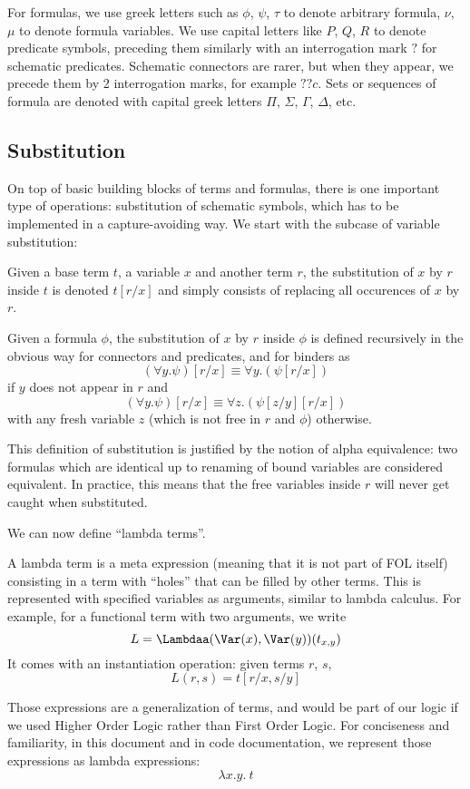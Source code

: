 For formulas, we use greek letters such as $\phi$, $\psi$, $\tau$ to denote arbitrary formula, $\nu$, $\mu$ to denote formula variables. We use capital letters like $P$, $Q$, $R$ to denote predicate symbols, preceding them similarly with an interrogation mark $?$ for schematic predicates. Schematic connectors are rarer, but when they appear, we precede them by 2 interrogation marks, for example $??c$. Sets or sequences of formula are denoted with capital greek letters $\Pi$, $\Sigma$, $\Gamma$, $\Delta$, etc.

\subsection{Substitution}
\label{subs:substitution}
On top of basic building blocks of terms and formulas, there is one important type of operations: substitution of schematic symbols, which has to be implemented in a capture-avoiding way. We start with the subcase of variable substitution:
\begin{defin}
Given a base term $t$, a variable $x$ and another term $r$, the substitution of $x$ by $r$ inside $t$ is denoted $ t[r/x] $ and simply consists of replacing all occurences of $x$ by $r$.

Given a formula $\phi$, the substitution of $x$ by $r$ inside $\phi$ is defined recursively in the obvious way for connectors and predicates, and for binders as
$$
(\forall y. \psi)[r/x] \equiv \forall y. (\psi[r/x])
$$
if $y$ does not appear in $r$ and
$$
(\forall y. \psi)[r/x] \equiv \forall z. (\psi[z/y][r/x])
$$
with any fresh variable $z$ (which is not free in $r$ and $\phi$) otherwise.
\end{defin}

This definition of substitution is justified by the notion of alpha equivalence: two formulas which are identical up to renaming of bound variables are considered equivalent. In practice, this means that the free variables inside $r$ will never get caught when substituted.

We can now define \enquote{lambda terms}.
\begin{defin}
A lambda term is a  meta expression (meaning that it is not part of FOL itself) consisting in a term with ``holes'' that can be filled by other terms. This is represented with specified variables as arguments, similar to lambda calculus. For example, for a functional term with two arguments, we write
$$
L = \Lambdaa(\Var(x), \Var(y))(t_{x,y})
$$
It comes with an instantiation operation: given terms $r$, $s$,
$$L(r, s) = t[r/x, s/y]$$
\end{defin}
Those expressions are a generalization of terms, and would be part of our logic if we used Higher Order Logic rather than First Order Logic. For conciseness and familiarity, in this document and in code documentation, we represent those expressions as lambda expressions:
$$
\lambda x.y. ~t
$$

